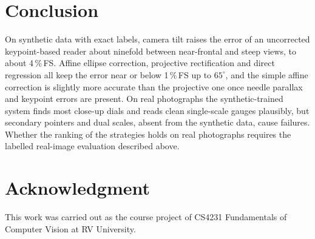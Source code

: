 \documentclass[conference]{IEEEtran}
\begin{document}
\section{Conclusion}
On synthetic data with exact labels, camera tilt raises the error of an uncorrected keypoint-based reader about
ninefold between near-frontal and steep views, to about 4\,\%\,FS. Affine ellipse correction, projective
rectification and direct regression all keep the error near or below 1\,\%\,FS up to $65^\circ$, and the simple
affine correction is slightly more accurate than the projective one once needle parallax and keypoint errors are
present. On real photographs the synthetic-trained system finds most close-up dials and reads clean single-scale
gauges plausibly, but secondary pointers and dual scales, absent from the synthetic data, cause failures. Whether the
ranking of the strategies holds on real photographs requires the labelled real-image evaluation described above.

\section*{Acknowledgment}
This work was carried out as the course project of CS4231 Fundamentals of Computer Vision at RV University.
\end{document}
